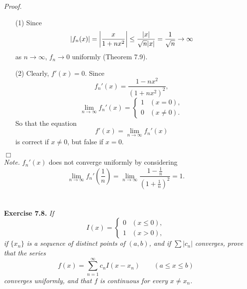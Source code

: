\documentclass{article}
\begin{document}
\emph{Proof.}
\begin{enumerate}
  \item[(1)]
  Since
  \[
    \abs{ f_n(x) }
    = \abs{ \frac{x}{1+nx^2} }
    \leq \frac{|x|}{\sqrt{n}|x|}
    = \frac{1}{\sqrt{n}} \to \infty
  \]
  as $n \to \infty$, $f_n \to 0$ uniformly (Theorem 7.9).

  \item[(2)]
  Clearly, $f'(x) = 0$.
  Since
  \[
    f_n'(x) = \frac{1-nx^2}{(1+nx^2)^2},
  \]
  \begin{equation*}
  \lim_{n \to \infty} f_n'(x) =
    \begin{cases}
      1 & (x = 0), \\
      0 & (x \neq 0).
    \end{cases}
  \end{equation*}
  So that the equation
  \[
    f'(x) = \lim_{n \to \infty} f_n'(x)
  \]
  is correct if $x \neq 0$, but false if $x = 0$.
\end{enumerate}
$\Box$ \\

\emph{Note.}
$f_n'(x)$ does not converge uniformly by considering
\[
  \lim_{n \to \infty} f_n'\left(\frac{1}{n}\right)
  = \lim_{n \to \infty} \frac{1-\frac{1}{n}}{(1+\frac{1}{n})^2}
  = 1.
\]
\\\\






\textbf{Exercise 7.8.}
\emph{If
  \begin{equation*}
  I(x) =
    \begin{cases}
      0 & (x \leq 0), \\
      1 & (x > 0),
    \end{cases}
  \end{equation*}
if $\{ x_n \}$ is a sequence of distinct points of $(a,b)$,
and if $\sum|c_n|$ converges,
prove that the series
\[
  f(x) = \sum_{n=1}^{\infty} c_n I(x-x_n)
  \qquad
  (a \leq x \leq b)
\]
converges uniformly,
and that $f$ is continuous for every $x \neq x_n$.} \\
\end{document}
